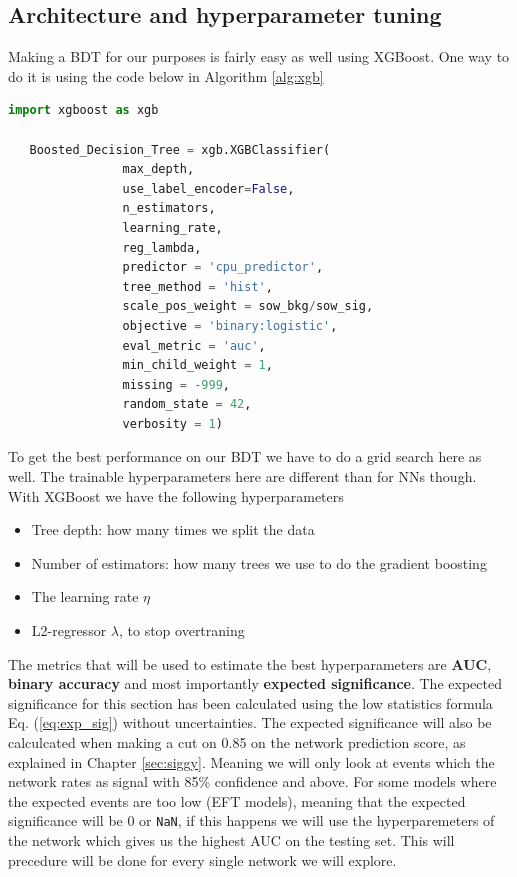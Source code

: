 \documentclass[12pt, a4paper]{book}
\begin{document}
\subsection{Architecture and hyperparameter tuning}\label{sec:BDTGriddy}
Making a BDT for our purposes is fairly easy as well using XGBoost. One way to do it is using the code below in Algorithm \ref{alg:xgb}
\begin{lstlisting}[language=Python, caption={Boosted Decision Tree definition using XGBoost}, label=alg:xgb, captionpos=t]
   import xgboost as xgb
   
   Boosted_Decision_Tree = xgb.XGBClassifier(
                max_depth, 
                use_label_encoder=False,
                n_estimators,
                learning_rate,
                reg_lambda,
                predictor = 'cpu_predictor',
                tree_method = 'hist',
                scale_pos_weight = sow_bkg/sow_sig,
                objective = 'binary:logistic',
                eval_metric = 'auc',
                min_child_weight = 1,
                missing = -999,
                random_state = 42,
                verbosity = 1) 
\end{lstlisting}
To get the best performance on our BDT we have to do a grid search here as well. The trainable hyperparameters here are different than for NNs though. With XGBoost we have the following hyperparameters
\begin{itemize}
   \item Tree depth: how many times we split the data
   \item Number of estimators: how many trees we use to do the gradient boosting
   \item The learning rate $\eta$
   \item L2-regressor $\lambda$, to stop overtraning
\end{itemize}
The metrics that will be used to estimate the best hyperparameters are \textbf{AUC}, \textbf{binary accuracy} and most importantly \textbf{expected significance}. 
The expected significance for this section has been calculated using the low statistics formula Eq. (\ref{eq:exp_sig}) without uncertainties. The expected significance will also be calculcated when making a cut on 0.85 on the network prediction score, as explained in Chapter \ref{sec:siggy}. 
Meaning we will only look at events which the network rates as signal with 85\% confidence and above. For some models where the expected events are too low (EFT models), meaning that the expected significance will be 0 or \verb|NaN|, if this happens we will use the hyperparemeters of the network 
which gives us the highest AUC on the testing set. This will precedure will be done for every single network we will explore.
\end{document}

